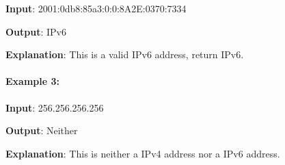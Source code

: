 \begin{flushleft}
\textbf{Input}: 2001:0db8:85a3:0:0:8A2E:0370:7334

\textbf{Output}: IPv6

\textbf{Explanation}: This is a valid IPv6 address, return IPv6.
\end{flushleft}

\paragraph{Example 3:}

\begin{flushleft}
\textbf{Input}: 256.256.256.256

\textbf{Output}: Neither

\textbf{Explanation}: This is neither a IPv4 address nor a IPv6 address.
\end{flushleft}


